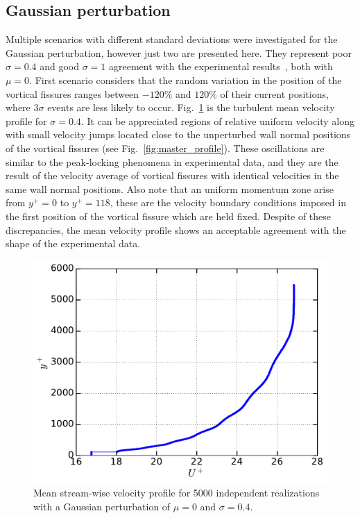\documentclass[aps,reprint,amsmath,amssymb,pra,floatfix]{revtex4-1}%
\begin{document}
\subsection{Gaussian perturbation}
Multiple scenarios with different standard deviations were investigated for the Gaussian perturbation, however just two are presented here. They represent poor $\sigma=0.4$ and good $\sigma=1$ agreement with the experimental results~\cite{Vincenti2013,FLM}, both with $\mu=0$. First scenario considers that the random variation in the position of the vortical fissures ranges between $-120\%$ and $120\%$ of their current positions, where $3\sigma$ events are less likely to occur. Fig.~\ref{fig:mean_profile} is the turbulent mean velocity profile for $\sigma=0.4$. It can be appreciated regions of relative uniform velocity along with small velocity jumps located close to the unperturbed wall normal positions of the vortical fissures (see Fig.~\ref{fig:master_profile}). These oscillations are similar to the peak-locking phenomena in experimental data, and they are the result of  the velocity average of vortical fissures with identical velocities in the same wall normal positions. Also note that an uniform momentum zone arise from $y^+=0$ to $y^+=118$, these are the velocity boundary conditions imposed in the first position of the vortical fissure which are held fixed. Despite of these discrepancies, the mean velocity profile shows an acceptable agreement with the shape of the experimental data.\\
\begin{figure}[b]
\includegraphics[scale=0.46]{figures/Master_averaged_step_profile_5000_assembles}
\caption{\label{fig:mean_profile} Mean stream-wise velocity profile for 5000 independent realizations with a Gaussian perturbation of $\mu=0$ and $\sigma=0.4$.}
\end{figure}
\end{document}
